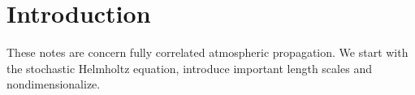\section{Introduction}
These notes are concern fully correlated atmospheric propagation.  We start with the stochastic 
Helmholtz equation, introduce important length scales and nondimensionalize.

